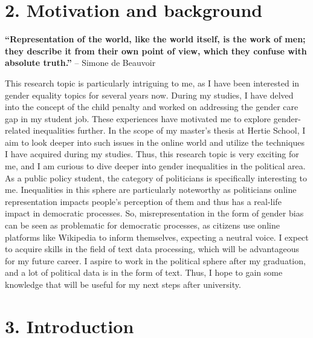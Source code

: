 \documentclass[
]{article}
\begin{document}
\hypertarget{motivation-and-background}{%
\section{2. Motivation and background}\label{motivation-and-background}}

\textbf{``Representation of the world, like the world itself, is the
work of men; they describe it from their own point of view, which they
confuse with absolute truth.''} -- Simone de Beauvoir

This research topic is particularly intriguing to me, as I have been
interested in gender equality topics for several years now. During my
studies, I have delved into the concept of the child penalty and worked
on addressing the gender care gap in my student job. These experiences
have motivated me to explore gender-related inequalities further. In the
scope of my master's thesis at Hertie School, I aim to look deeper into
such issues in the online world and utilize the techniques I have
acquired during my studies. Thus, this research topic is very exciting
for me, and I am curious to dive deeper into gender inequalities in the
political area. As a public policy student, the category of politicians
is specifically interesting to me. Inequalities in this sphere are
particularly noteworthy as politicians online representation impacts
people's perception of them and thus has a real-life impact in
democratic processes. So, misrepresentation in the form of gender bias
can be seen as problematic for democratic processes, as citizens use
online platforms like Wikipedia to inform themselves, expecting a
neutral voice. I expect to acquire skills in the field of text data
processing, which will be advantageous for my future career. I aspire to
work in the political sphere after my graduation, and a lot of political
data is in the form of text. Thus, I hope to gain some knowledge that
will be useful for my next steps after university.

\hypertarget{introduction}{%
\section{3. Introduction}\label{introduction}}
\end{document}
